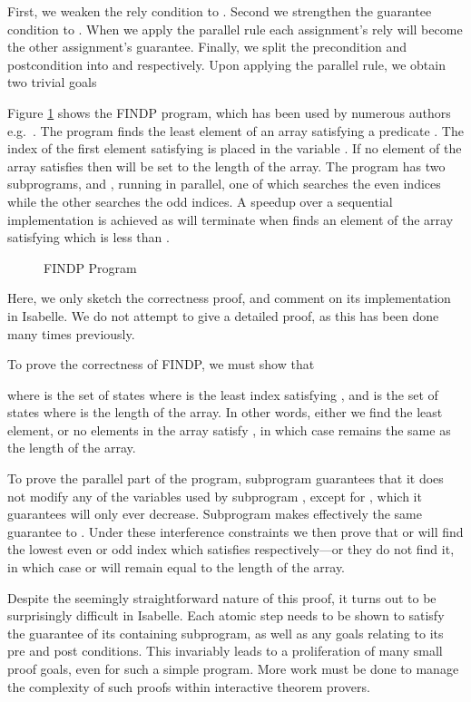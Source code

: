 \documentclass{llncs}
\begin{document}
First, we weaken the rely condition to . Second we strengthen the guarantee condition to
. When we apply the parallel
rule each assignment's rely will become the other assignment's
guarantee. Finally, we split the precondition and postcondition into
 and  respectively. Upon applying the
parallel rule, we obtain two trivial goals


Figure \ref{fig:findp} shows the FINDP program, which has been
used by numerous authors
e.g.~\cite{owicki_axiomatic_1975,jones_development_1981,de_roever_concurrency_2001,hayes_refining_2013}. The
program finds the least element of an array satisfying a predicate
. The index of the first element satisfying  is placed in the
variable . If no element of the array satisfies 
then  will be set to the length of the array. The program has two
subprograms,  and , running in parallel, one of which searches
the even indices while the other searches the odd indices. A speedup
over a sequential implementation is achieved as  will terminate
when  finds an element of the array satisfying  which is less
than .
\begin{figure}

\caption{FINDP Program}
\label{fig:findp}
\end{figure}

Here, we only sketch the correctness proof, and comment on its
implementation in Isabelle. We do not attempt to give a detailed
proof, as this has been done many times previously.

To prove the correctness of FINDP, we must show that

where  is the set of states where  is the least
index satisfying , and  is the set of states where
 is the length of the array. In other words, either we find the
least element, or no elements in the array satisfy , in which case
 remains the same as the length of the array.

To prove the parallel part of the program, subprogram  guarantees
that it does not modify any of the variables used by subprogram ,
except for , which it guarantees will only ever
decrease. Subprogram  makes effectively the same guarantee to
. Under these interference constraints we then prove that  or
 will find the lowest even or odd index which satisfies 
respectively---or they do not find it, in which case  or 
will remain equal to the length of the array.

Despite the seemingly straightforward nature of this proof, it turns
out to be surprisingly difficult in Isabelle. Each atomic step
needs to be shown to satisfy the guarantee of its containing
subprogram, as well as any goals relating to its pre and post
conditions. This invariably leads to a proliferation of many small
proof goals, even for such a simple program. More work must be done
to manage the complexity of such proofs within interactive theorem
provers.
\end{document}
